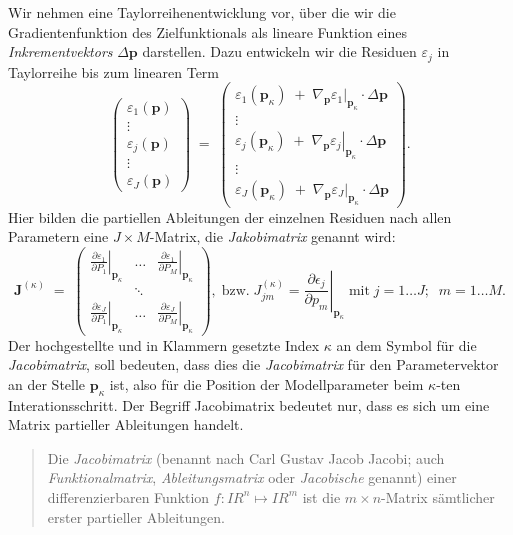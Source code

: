 Wir nehmen eine Taylorreihenentwicklung vor, über die wir die Gradientenfunktion des Zielfunktionals
als lineare Funktion eines \textsl{Inkrementvektors} $\Delta \mathbf{p}$ darstellen. Dazu entwickeln
wir die Residuen $\varepsilon_j$ in Taylorreihe bis zum linearen Term
\begin{equation}
\left(\begin{array}{c}
\varepsilon_1(\mathbf{p}) \\
\vdots \\
\varepsilon_j(\mathbf{p}) \\
\vdots \\
\varepsilon_J(\mathbf{p}) 
\end{array}\right)
\; = \; 
\left(\begin{array}{c}
\varepsilon_1(\mathbf{p}_\kappa) \; + \; \nabla_{\mathbf{p}} \left. \varepsilon_1 \right|_{\mathbf{p}_\kappa} \cdot \Delta \mathbf{p}\\
\vdots \\
\varepsilon_j(\mathbf{p}_\kappa) \; + \; \nabla_{\mathbf{p}} \left. \varepsilon_j \right|_{\mathbf{p}_\kappa} \cdot \Delta \mathbf{p}\\
\vdots \\
\varepsilon_J(\mathbf{p}_\kappa) \; + \; \nabla_{\mathbf{p}} \left. \varepsilon_J \right|_{\mathbf{p}_\kappa} \cdot \Delta \mathbf{p}
\end{array}\right).
\label{TaylorResi1}
\end{equation}
Hier bilden die partiellen Ableitungen der einzelnen Residuen nach allen Parametern eine $J \times M$-Matrix, die \textsl{Jakobimatrix}
genannt wird:
\begin{equation}
\boldsymbol{J}^{(\kappa)} \; = \; \left(\begin{array}{ccc}
\left. \frac{\partial \varepsilon_1}{\partial P_1} \right|_{\mathbf{p}_\kappa} & \dots & \left. \frac{\partial \varepsilon_1}{\partial P_M} \right|_{\mathbf{p}_\kappa} \\
 & \ddots & \\
\left. \frac{\partial \varepsilon_J}{\partial P_1}\right|_{\mathbf{p}_\kappa} & \dots & \left. \frac{\partial \varepsilon_J}{\partial P_M}\right|_{\mathbf{p}_\kappa}
\end{array}\right) ,\; \textrm{bzw.} \; J_{jm}^{(\kappa)}= \left. \frac{\partial \epsilon_j}{\partial p_m}\right|_{\mathbf{p}_\kappa}
\;\textrm{mit} \; j=1\ldots J; \;\; m=1\ldots M.
\end{equation}
Der hochgestellte und in Klammern gesetzte Index $\kappa$ 
an dem Symbol für die \textsl{Jacobimatrix}, soll bedeuten,
dass dies die \textsl{Jacobimatrix} für den Parametervektor an der Stelle
$\mathbf{p}_\kappa$ ist, also für die Position der Modellparameter beim $\kappa$-ten Interationsschritt.
Der Begriff Jacobimatrix bedeutet nur, dass es
sich um eine Matrix partieller Ableitungen handelt.
\begin{quote}
Die \textsl{Jacobimatrix} (benannt nach Carl Gustav Jacob Jacobi; auch 
\textsl{Funktionalmatrix}, \textsl{Ableitungsmatrix} oder \textsl{Jacobische} genannt)
einer differenzierbaren Funktion
$f\colon I \! \! R^{n} \mapsto I \! \! R ^{m}$ ist die 
$m\times n$-Matrix sämtlicher erster partieller Ableitungen.
\end{quote}


